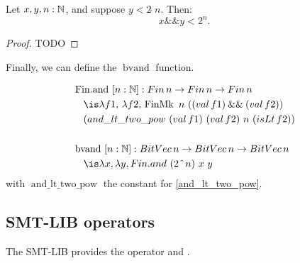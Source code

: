 \begin{lemma}
Let \( x, y, n : \mathbb{N} \), and suppose \( y < 2 \,\hat{}\, n \). Then:
\[
x \mathbin{\&\&} y < 2^n.
\]
\label{and_lt_two_pow}
\begin{proof} TODO \end{proof}
\end{lemma}

Finally, we can define the $\mathop{bvand}$ function.

\begin{definition}
\begin{align*}
&\mathop{\mathrm{Fin.and}}~[n: \N]: \mathop{Fin} n \ra \mathop{Fin} n \ra \mathop{Fin} n\\
&\quad\is \lambda f1,\, \lambda f2,\, \mathop{\mathrm{FinMk}}~n~((\mathop{val} f1) \mathbin{\&\&} (\mathop{val} f2)) \\
&\quad (\mathop{and\_lt\_two\_pow}~(\mathop{val} f1)~(\mathop{val} f2)~n~(\mathop{isLt} f2)) \\
&\\
&\mathop{\mathrm{bvand}}~[n: \N]: \mathop{BitVec} n \ra \mathop{BitVec} n \ra \mathop{BitVec} n\\
&\quad\is \lambda x, \lambda y, \mathop{Fin.and}~(2~\hat{}~n)~x~y
\end{align*}
with $\mathop{and\_lt\_two\_pow}$ the constant for \cref{and_lt_two_pow}.
\end{definition}



\subsection{SMT-LIB operators}
\label{ssec:encoding-distinct-let-enc}

The SMT-LIB provides the operator  and .
